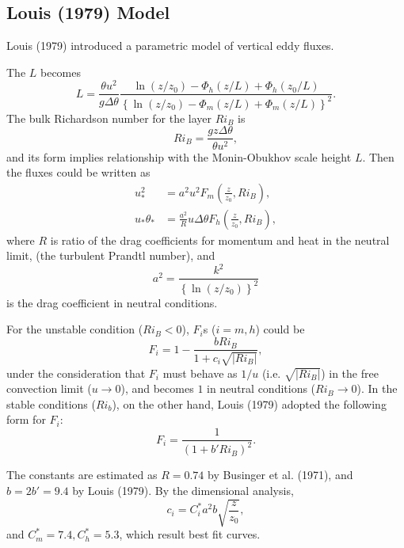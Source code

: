 \subsection{Louis (1979) Model}
Louis (1979) introduced a parametric model of vertical eddy fluxes.

The $L$ becomes
\begin{equation}
  L = \frac{\theta u^2}{g\Delta\theta}
    \frac{\ln(z/z_0)-\Phi_h(z/L)+\Phi_h(z_0/L)}{\left\{\ln(z/z_0)-\Phi_m(z/L)+\Phi_m(z/L)\right\}^2}.
\end{equation}
The bulk Richardson number for the layer $Ri_B$ is
\begin{equation}
  Ri_B = \frac{gz\Delta\theta}{\theta u^2},
\end{equation}
and its form implies relationship with the Monin-Obukhov scale height $L$.
Then the fluxes could be written as
\begin{align}
  u_*^2 &= a^2 u^2 F_m\left(\frac{z}{z_0},Ri_B\right), \label{eq: u_*^2} \\
  u_*\theta_* &= \frac{a^2}{R} u \Delta \theta F_h\left(\frac{z}{z_0},Ri_B\right), \label{eq: u_*t_*}
\end{align}
where
$R$ is ratio of the drag coefficients for momentum and heat in the neutral limit,
(the turbulent Prandtl number),
and
\begin{equation}
  a^2 = \frac{k^2}{\left\{\ln\left(z/z_0\right)\right\}^2}
\end{equation}
is the drag coefficient in neutral conditions.

For the unstable condition ($Ri_B<0$),
$F_i$s ($i=m,h$) could be
\begin{equation}
  F_i = 1 - \frac{b Ri_B}{1 + c_i \sqrt{|Ri_B|}},
  \label{eq: F_i unstable}
\end{equation}
under the consideration that
$F_i$ must behave as $1/u$ (i.e. $\sqrt{|Ri_B|}$) in the free convection limit ($u \to 0$),
and becomes $1$ in neutral conditions ($Ri_B \to 0$).
In the stable conditions ($Ri_b$), on the other hand,
Louis (1979) adopted the following form for $F_i$:
\begin{equation}
  F_i = \frac{1}{(1 + b' Ri_B)^2}.
  \label{eq: F_i stable}
\end{equation}

The constants are estimated as
$R=0.74$ by Businger et al. (1971),
and $b=2b'=9.4$ by Louis (1979).
By the dimensional analysis,
\begin{equation}
  c_i = C^*_i a^2 b \sqrt{\frac{z}{z_0}},
\end{equation}
and $C^*_m = 7.4, C^*_h = 5.3$, which result best fit curves.



